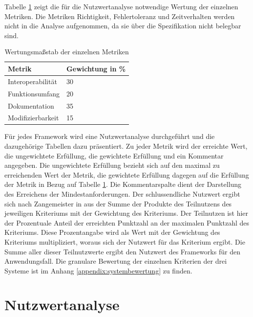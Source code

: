 Tabelle \ref{table:Wertungsmassstab} zeigt die für die Nutzwertanalyse notwendige Wertung der einzelnen Metriken.
Die Metriken Richtigkeit, Fehlertoleranz und Zeitverhalten werden nicht in die Analyse aufgenommen, da sie über die Spezifikation nicht belegbar sind.
\begin{table}[h!]
\centering
\begin{tabular}{l|l}
\textbf{Metrik} & \textbf{Gewichtung in \%} \\ \hline
Interoperabilität & 30 \\ \hline
Funktionsumfang & 20 \\ \hline
Dokumentation & 35 \\ \hline
Modifizierbarkeit & 15
\end{tabular}
\caption{Wertungsmaßstab der einzelnen Metriken}
\label{table:Wertungsmassstab}
\end{table}

Für jedes Framework wird eine Nutzwertanalyse durchgeführt und die dazugehörige Tabellen dazu präsentiert.
Zu jeder Metrik wird der erreichte Wert, die ungewichtete Erfüllung, die gewichtete Erfüllung und ein Kommentar angegeben.
Die ungewichtete Erfüllung bezieht sich auf den maximal zu erreichenden Wert der Metrik, die gewichtete Erfüllung dagegen auf die Erfüllung der Metrik in Bezug auf Tabelle \ref{table:Wertungsmassstab}.
Die Kommentarspalte dient der Darstellung des Erreichens der Mindestanforderungen.
Der schlussendliche Nutzwert ergibt sich nach Zangemeister in \cite{website:nutzwertanalyse} aus der Summe der Produkte des Teilnutzens des jeweiligen Kriteriums mit der Gewichtung des Kriteriums.
Der Teilnutzen ist hier der Prozentuale Anteil der erreichten Punktzahl an der maximalen Punktzahl des Kriteriums.
Diese Prozentangabe wird als Wert mit der Gewichtung des Kriteriums multipliziert, woraus sich der Nutzwert für das Kriterium ergibt.
Die Summe aller dieser Teilnutzwerte ergibt den Nutzwert des Frameworks für den Anwendungsfall.
Die granulare Bewertung der einzelnen Kriterien der drei Systeme ist im Anhang \ref{appendix:systembewertung} zu finden.

\section{Nutzwertanalyse}

